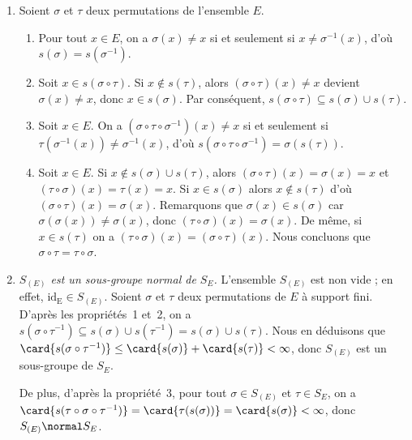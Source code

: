 \begin{enumerate}
  \item %
    Soient $\sigma$ et $\tau$ deux permutations de l'ensemble $E$.
    \begin{enumerate}[1)]
      \item %
        Pour tout $x\in E$, on a $\sigma(x)\neq x$ si et seulement si $x\neq \sigma^{-1}(x)$, d'où $s(\sigma) = s(\sigma^{-1})$.

      \item %
        Soit $x\in s(\sigma\circ\tau)$. Si $x\notin s(\tau)$, alors $(\sigma\circ\tau)(x) \neq x$ devient $\sigma(x)\neq x$, donc $x\in s(\sigma)$.
        Par conséquent, $s(\sigma\circ\tau)\subseteq s(\sigma)\cup s(\tau)$.

      \item %
        Soit $x\in E$.
        On a $(\sigma\circ\tau\circ\sigma^{-1})(x) \neq x$ si et seulement si $\tau(\sigma^{-1}(x)) \neq \sigma^{-1}(x)$, d'où $s(\sigma\circ\tau\circ\sigma^{-1}) = \sigma(s(\tau))$.

      \item %
        Soit $x\in E$.
        Si $x\notin s(\sigma)\cup s(\tau)$, alors $(\sigma\circ\tau)(x) = \sigma(x) = x$ et $(\tau\circ\sigma)(x) = \tau(x) = x$.
        Si $x\in s(\sigma)$ alors $x\notin s(\tau)$ d'où $(\sigma\circ\tau)(x) = \sigma(x)$.
        Remarquons que $\sigma(x)\in s(\sigma)$ car $\sigma(\sigma(x)) \neq \sigma(x)$, donc $(\tau\circ\sigma)(x) = \sigma(x)$.
        De même, si $x\in s(\tau)$ on a $(\tau\circ\sigma)(x) = (\sigma\circ\tau)(x)$.
        Nous concluons que $\sigma\circ\tau = \tau\circ\sigma$.
    \end{enumerate}

  \item %
    \emph{$S_{(E)}$ est un sous-groupe normal de $S_E$.}
    L'ensemble $S_{(E)}$ est non vide ; en effet, $\mathrm{id_E}\in S_{(E)}$.
    Soient $\sigma$ et $\tau$ deux permutations de $E$ à support fini.
    D'après les propriétés~1 et~2, on a $s(\sigma\circ\tau^{-1})\subseteq s(\sigma)\cup s(\tau^{-1})=s(\sigma)\cup s(\tau)$.
    Nous en déduisons que $\card{s(\sigma\circ\tau^{-1})}\leq \card{s(\sigma)} + \card{s(\tau)} < \infty$, donc $S_{(E)}$ est un sous-groupe de $S_E$.

    De plus, d'après la propriété~3, pour tout $\sigma\in S_{(E)}$ et $\tau\in S_E$, on a $\card{s(\tau\circ\sigma\circ\tau^{-1})} = \card{\tau(s(\sigma))} = \card{s(\sigma)} < \infty$, donc $S_{(E)}\normal S_E$.


\end{enumerate}
